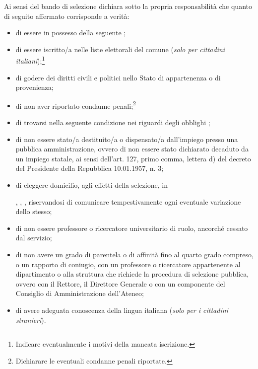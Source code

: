 	Ai sensi del bando di selezione \myTextField[.5cm]{} 
	dichiara sotto la propria responsabilità che quanto di seguito affermato
	corrisponde a verità:
	\begin{itemize}
		\item di essere in possesso della seguente ;
		\item di essere iscritto/a nelle liste elettorali del comune 
		      (\emph{solo per cittadini italiani});\footnote{Indicare eventualmente i motivi
			      della mancata iscrizione.}

		      \myTextField[.9\textwidth]{}
		\item di godere dei diritti civili e politici nello Stato di appartenenza o di
		      provenienza;
		\item di non aver riportato condanne penali;\footnote{Dichiarare le eventuali
			      condanne penali riportate.}

		      \myTextField[.9\textwidth]{}
		\item di trovarsi nella seguente condizione nei riguardi degli obblighi
		      ;
		\item di non essere stato/a destituito/a o dispensato/a dall'impiego presso una
		      pubblica amministrazione, ovvero di non essere stato dichiarato decaduto da un
		      impiego statale, ai sensi dell'art. 127, primo comma, lettera d) del decreto
		      del Presidente della Repubblica 10.01.1957, n. 3;
		\item di eleggere domicilio, agli effetti della selezione, in
		      \begin{center}
			      \titleTextField[6cm]{}
		      \end{center}
		      , , ,
		      riservandosi di comunicare tempestivamente ogni eventuale variazione dello stesso;
		\item di non essere professore o ricercatore universitario di ruolo, ancorché
		      cessato dal servizio;
		\item di non avere un grado di parentela o di affinità fino al quarto grado
		      compreso, o un rapporto di coniugio, con un professore o ricercatore appartenente
		      al dipartimento o alla struttura che richiede la procedura di selezione pubblica,
		      ovvero con il Rettore, il Direttore Generale o con un componente del Consiglio
		      di Amministrazione dell’Ateneo;
		\item di avere adeguata conoscenza della lingua italiana (\emph{solo per i
			      cittadini stranieri}).
	\end{itemize}
